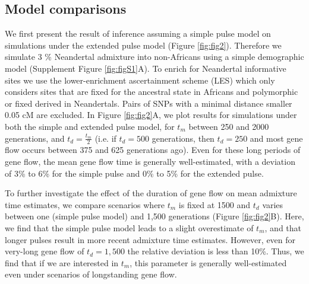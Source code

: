 \documentclass[]{article}
\begin{document}
\subsection{Model comparisons}\label{Model comparison}
We first present the result of inference assuming a simple pulse model on simulations under the extended pulse model (Figure \ref{fig:fig2}). Therefore we simulate 3 \% Neandertal admixture into non-Africans using a simple demographic model (Supplement Figure \ref{fig:figS1}A). To enrich for Neandertal informative sites we use the lower-enrichment ascertainment scheme (LES)  which only considers sites that are fixed for the ancestral state in Africans and polymorphic or fixed derived in Neandertals. Pairs of SNPs with a minimal distance smaller 0.05 cM are excluded.
In Figure \ref{fig:fig2}A, we plot results for simulations under both the simple and extended pulse model, for $t_m$ between 250 and 2000 generations, and $t_d = \frac{t_m}{2}$  (i.e. if $t_d= 500$ generations, then $t_d = 250$ and most gene flow occurs between  375 and 625
generations ago). Even for these long periods of gene flow, the mean gene flow time is generally well-estimated, with a deviation of 3\% to 6\% for the simple pulse and 0\% to 5\% for
the extended pulse.

To further investigate the effect of the duration of gene flow on mean
admixture time estimates, we compare scenarios where $t_m$ is fixed at 1500 and $t_d$ varies between one (simple pulse model) and 1,500 generations (Figure \ref{fig:fig2}B). Here, we find that the simple pulse model leads to a slight overestimate of $t_m$, and that longer pulses result in more recent admixture time estimates. However, even  for very-long gene flow of $t_d=1,500$ the relative deviation is less than 10\%. Thus, we find that if we are interested in $t_m$, this parameter is generally well-estimated even under scenarios of longstanding gene flow.
\end{document}
